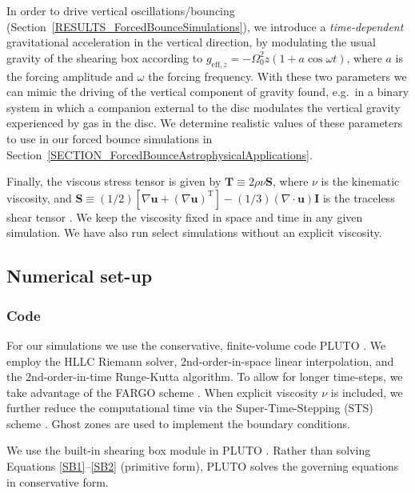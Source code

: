 \documentclass[fleqn,usenatbib]{mnras}
\begin{document}
In order to drive vertical oscillations/bouncing (Section~\ref{RESULTS_ForcedBounceSimulations}), we introduce a \textit{time-dependent} gravitational acceleration in the vertical direction, by modulating the usual gravity of the shearing box according to $g_{\text{eff},z} = -\Omega_0^2 z (1+a\cos{\omega t})$, where $a$ is the forcing amplitude and $\omega$ the forcing frequency.
With these two parameters we can mimic the driving of the vertical component of gravity found, e.g.\ in a binary system in which a companion external to the disc modulates the vertical gravity experienced by gas in the disc. We determine realistic values of these parameters to use in our forced bounce simulations in Section~\ref{SECTION_ForcedBounceAstrophysicalApplications}.

Finally, the viscous stress tensor is given by $\mathbf{T} \equiv 2\rho \nu \mathbf{S}$, where $\nu$ is the kinematic viscosity, and $\mathbf{S} \equiv (1/2)[\nabla \mathbf{u} + (\nabla \mathbf{u})^\text{T}] - (1/3)(\nabla\cdot\mathbf{u})\mathbf{I}$ is the traceless shear tensor \citep{landau1987}. We keep the viscosity fixed in space and time in any given simulation. We have also run select simulations without an explicit viscosity.


\subsection{Numerical set-up}
\label{METHODS_NumericalSetUp}

\subsubsection{Code}
\label{Methods_Codes}
For our simulations we use the conservative, finite-volume code \textsc{PLUTO} \citep{mignone2007}. We employ the HLLC Riemann solver, 2nd-order-in-space linear interpolation, and the 2nd-order-in-time Runge-Kutta algorithm. To allow for longer time-steps, we take advantage of the \textsc{FARGO} scheme \citep{mignone2012}. When explicit viscosity $\nu$ is included, we further reduce the computational time via the Super-Time-Stepping (STS) scheme \citep{alexiades1996super}. Ghost zones are used to implement the boundary conditions.

We use the built-in shearing box module in \textsc{PLUTO}
\citep{mignone2012}. Rather than solving Equations \eqref{SB1}--\eqref{SB2} (primitive
form), \textsc{PLUTO} solves the governing equations in conservative form.
\end{document}
